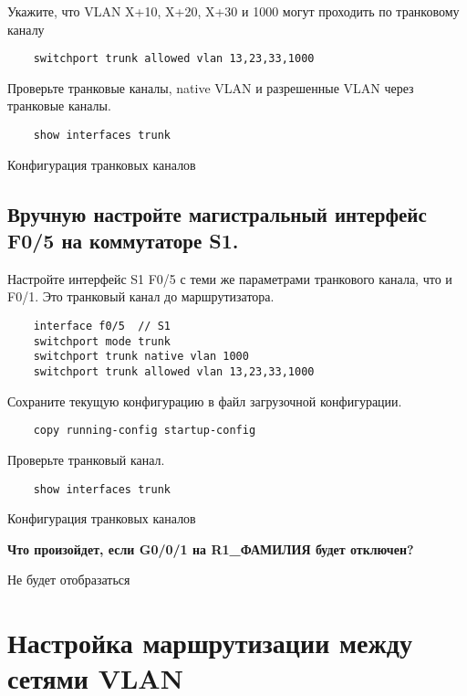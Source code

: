 Укажите, что VLAN X+10, X+20, X+30 и 1000 могут проходить по транковому каналу

\begin{verbatim}
	switchport trunk allowed vlan 13,23,33,1000
\end{verbatim}

Проверьте транковые каналы, native VLAN
и разрешенные VLAN через транковые каналы.

\begin{verbatim}
	show interfaces trunk
\end{verbatim}

\begin{image}
	\caption{Конфигурация транковых каналов}
	\label{fig:switch:trunk:0}
\end{image}

\subsection{Вручную настройте магистральный интерфейс F0/5 на коммутаторе S1.}
Настройте интерфейс S1 F0/5 с теми же параметрами транкового канала,
что и F0/1. Это транковый канал до маршрутизатора.

\begin{verbatim}
	interface f0/5  // S1
	switchport mode trunk
	switchport trunk native vlan 1000
	switchport trunk allowed vlan 13,23,33,1000
\end{verbatim}

Сохраните текущую конфигурацию в файл загрузочной конфигурации.

\begin{verbatim}
	copy running-config startup-config
\end{verbatim}

Проверьте транковый канал.

\begin{verbatim}
	show interfaces trunk
\end{verbatim}

\begin{image}
	\caption{Конфигурация транковых каналов}
	\label{fig:switch:trunk}
\end{image}


\textbf{Что произойдет, если G0/0/1 на R1\_ФАМИЛИЯ будет отключен?}

Не будет отобразаться

\section{Настройка маршрутизации между сетями VLAN}
